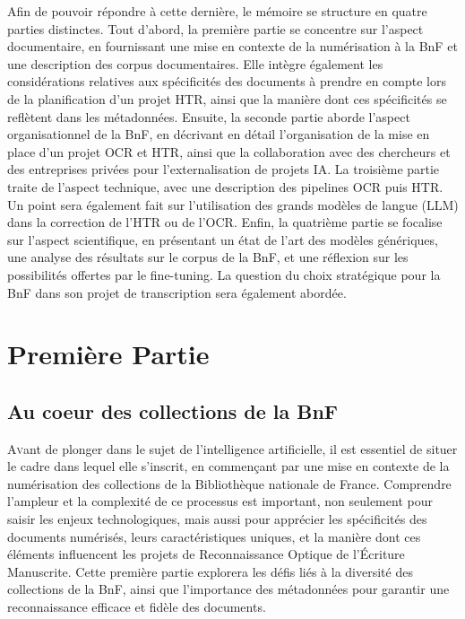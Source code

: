 \documentclass[a4paper,12pt,twoside]{book}
\begin{document}
Afin de pouvoir répondre à cette dernière, le mémoire se structure en
quatre parties distinctes. Tout d’abord, la première partie se concentre sur
l’aspect documentaire, en fournissant une mise en contexte de la numérisation
à la BnF et une description des corpus documentaires. Elle intègre également
les considérations relatives aux spécificités des documents à prendre en
compte lors de la planification d’un projet HTR, ainsi que la manière dont ces
spécificités se reflètent dans les métadonnées. Ensuite, la seconde partie
aborde l’aspect organisationnel de la BnF, en décrivant en détail l’organisation
de la mise en place d’un projet OCR et HTR, ainsi que la collaboration avec des
chercheurs et des entreprises privées pour l’externalisation de projets IA. La troisième partie traite de l’aspect technique, avec une description des pipelines
OCR puis HTR. Un point sera également fait sur l’utilisation des grands modèles
de langue (LLM) dans la correction de l’HTR ou de l’OCR. Enfin, la quatrième
partie se focalise sur l’aspect scientifique, en présentant un état de l’art des
modèles génériques, une analyse des résultats sur le corpus de la BnF, et une
réflexion sur les possibilités offertes par le fine-tuning. La question du choix
stratégique pour la BnF dans son projet de transcription sera également
abordée.

\newpage{\pagestyle{empty}\cleardoublepage}

	\mainmatter

	

	\part{Première Partie}
\chapter{Au coeur des collections de la BnF}

\lettrine{A}vant de plonger dans le sujet de l’intelligence artificielle, il est
essentiel de situer le cadre dans lequel elle s’inscrit, en commençant
par une mise en contexte de la numérisation des collections de la
Bibliothèque nationale de France. Comprendre l’ampleur et la complexité de
ce processus est important, non seulement pour saisir les enjeux
technologiques, mais aussi pour apprécier les spécificités des documents
numérisés, leurs caractéristiques uniques, et la manière dont ces éléments
influencent les projets de Reconnaissance Optique de l’Écriture Manuscrite.
Cette première partie explorera les défis liés à la diversité des collections de la
BnF, ainsi que l’importance des métadonnées pour garantir une reconnaissance
efficace et fidèle des documents.
\end{document}
